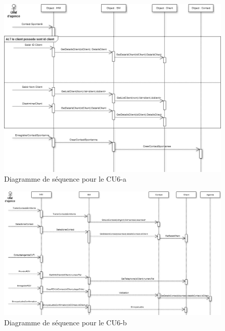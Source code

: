 \begin{figure}[H]
	\begin{center}
		\includegraphics[scale=0.4]{Includes/SOA-Sequence-CU6-a.png}
		\caption{Diagramme de séquence pour le CU6-a}
	\end{center}
\end{figure}
\begin{figure}[H]
	\begin{center}
		\includegraphics[scale=0.4]{Includes/SOA-Sequence-CU6-b.png}
		\caption{Diagramme de séquence pour le CU6-b}
	\end{center}
\end{figure}

